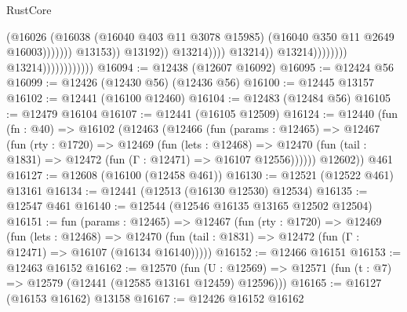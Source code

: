 \begin{lexlean}{RustCore}
\begin{coremodule}
                                                                        (@16026
                                                                          (@16038
                                                                            (@16040
                                                                              @403
                                                                              @11
                                                                              @3078
                                                                              @15985)
                                                                            (@16040
                                                                              @350
                                                                              @11
                                                                              @2649
                                                                              @16003)))))))
                                                                @13153))
                                                            @13192))
                                                        @13214))))
                                                @13214))
                                            @13214))))))))
                            @13214))))))))))))
@16094 := @12438 (@12607 @16092)
@16095 := @12424 @56
@16099 := @12426 (@12430 @56) (@12436 @56)
@16100 := @12445 @13157
@16102 := @12441 (@16100 @12460)
@16104 := @12483 (@12484 @56)
@16105 := @12479 @16104
@16107 := @12441 (@16105 @12509)
@16124 := @12440
    (fun (fn : @40) =>
    @16102
      (@12463
        (@12466
          (fun (params : @12465) =>
          @12467
            (fun (rty : @1720) =>
            @12469
              (fun (lets : @12468) =>
              @12470 (fun (tail : @1831) => @12472 (fun (Γ : @12471) => @16107 @12556))))))
        @12602))
    @461
@16127 := @12608 (@16100 (@12458 @461))
@16130 := @12521 (@12522 @461) @13161
@16134 := @12441 (@12513 (@16130 @12530) @12534)
@16135 := @12547 @461
@16140 := @12544 (@12546 @16135 @13165 @12502 @12504)
@16151 := fun (params : @12465) =>
  @12467
    (fun (rty : @1720) =>
    @12469
      (fun (lets : @12468) =>
      @12470 (fun (tail : @1831) => @12472 (fun (Γ : @12471) => @16107 (@16134 @16140)))))
@16152 := @12466 @16151
@16153 := @12463 @16152
@16162 := @12570
    (fun (U : @12569) => @12571 (fun (t : @7) => @12579 (@12441 (@12585 @13161 @12459) @12596)))
@16165 := @16127 (@16153 @16162) @13158
@16167 := @12426 @16152 @16162

\end{coremodule}
\end{lexlean}
